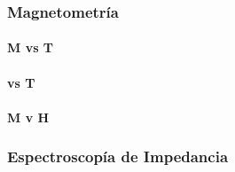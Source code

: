 \documentclass[../main.tex]{subfiles}
\begin{document}
\subsubsection{Magnetometría}

\paragraph{M vs T}

\paragraph{\textchi{} vs T}

\paragraph{M v H}
\subsubsection{Espectroscopía de Impedancia}
\end{document}
